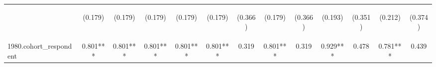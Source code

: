 \begin{center}
\begin{tabular}{lcccccccccccc}
\vspace{4pt} & \begin{footnotesize}(0.179)\end{footnotesize} & \begin{footnotesize}(0.179)\end{footnotesize} & \begin{footnotesize}(0.179)\end{footnotesize} & \begin{footnotesize}(0.179)\end{footnotesize} & \begin{footnotesize}(0.179)\end{footnotesize} & \begin{footnotesize}(0.366)\end{footnotesize} & \begin{footnotesize}(0.179)\end{footnotesize} & \begin{footnotesize}(0.366)\end{footnotesize} & \begin{footnotesize}(0.193)\end{footnotesize} & \begin{footnotesize}(0.351)\end{footnotesize} & \begin{footnotesize}(0.212)\end{footnotesize} & \begin{footnotesize}(0.374)\end{footnotesize} \\
1980.cohort\_respondent & 0.801*** & 0.801*** & 0.801*** & 0.801*** & 0.801*** & 0.319 & 0.801*** & 0.319 & 0.929*** & 0.478 & 0.781*** & 0.439 \\

\end{tabular}
\end{center}
